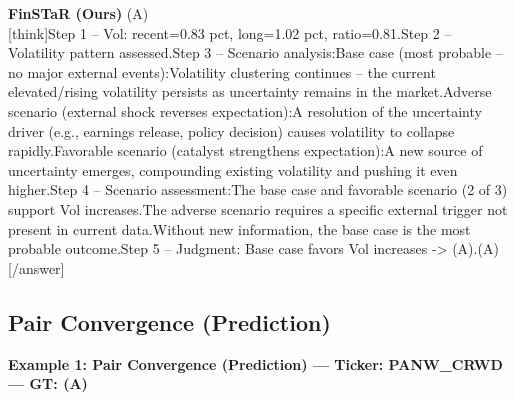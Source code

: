 \begin{minipage}[t]{0.41\textwidth}
\colorbox{green!10}{\parbox{\dimexpr\textwidth-2\fboxsep}{
\textbf{FinSTaR (Ours)} \textcolor{green!50!black}{(A)} \\[2pt]
\tiny
[think]\newline Step 1 -- Vol: recent=0.83 pct, long=1.02 pct, ratio=0.81.\newline Step 2 -- Volatility pattern assessed.\newline Step 3 -- Scenario analysis:\newline   Base case (most probable -- no major external events):\newline     Volatility clustering continues -- the current elevated/rising volatility persists as uncertainty remains in the market.\newline   Adverse scenario (external shock reverses expectation):\newline     A resolution of the uncertainty driver (e.g., earnings release, policy decision) causes volatility to collapse rapidly.\newline   Favorable scenario (catalyst strengthens expectation):\newline     A new source of uncertainty emerges, compounding existing volatility and pushing it even higher.\newline Step 4 -- Scenario assessment:\newline   The base case and favorable scenario (2 of 3) support Vol increases.\newline   The adverse scenario requires a specific external trigger not present in current data.\newline   Without new information, the base case is the most probable outcome.\newline Step 5 -- Judgment: Base case favors Vol increases -> (A).\newline [/think]\newline [answer](A)[/answer]
}}
\vspace{-30pt}
\end{minipage}

\clearpage
\subsection{Pair Convergence (Prediction)}


\noindent
\textbf{Example 1: Pair Convergence (Prediction) --- Ticker: PANW\_CRWD --- GT: (A)}
\vspace{2pt}

